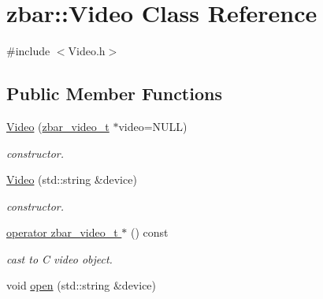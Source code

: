 \hypertarget{classzbar_1_1_video}{
\section{zbar::Video Class Reference}
\label{classzbar_1_1_video}
}


{\ttfamily \#include $<$Video.h$>$}

\subsection*{Public Member Functions}
\begin{DoxyCompactItemize}
\item 
\hypertarget{classzbar_1_1_video_a942db449a26345a34ca8510967ca3d24}{
\hyperlink{classzbar_1_1_video_a942db449a26345a34ca8510967ca3d24}{Video} (\hyperlink{zbar_8h_ac007ef048e15480ff7a6bf577cdf31fb}{zbar\_\-video\_\-t} $\ast$video=NULL)}
\label{classzbar_1_1_video_a942db449a26345a34ca8510967ca3d24}

\begin{DoxyCompactList}\small\item\em constructor. \end{DoxyCompactList}\item 
\hypertarget{classzbar_1_1_video_a742c410231b76a3e71cafa887789cd46}{
\hyperlink{classzbar_1_1_video_a742c410231b76a3e71cafa887789cd46}{Video} (std::string \&device)}
\label{classzbar_1_1_video_a742c410231b76a3e71cafa887789cd46}

\begin{DoxyCompactList}\small\item\em constructor. \end{DoxyCompactList}\item 
\hypertarget{classzbar_1_1_video_a8d0730e20300e1b0c4d4c11da04f615b}{
\hyperlink{classzbar_1_1_video_a8d0730e20300e1b0c4d4c11da04f615b}{operator zbar\_\-video\_\-t $\ast$} () const }
\label{classzbar_1_1_video_a8d0730e20300e1b0c4d4c11da04f615b}

\begin{DoxyCompactList}\small\item\em cast to C video object. \end{DoxyCompactList}\item 
\hypertarget{classzbar_1_1_video_a3f00f61e5e24629cae196bcfd80f1cf0}{
void \hyperlink{classzbar_1_1_video_a3f00f61e5e24629cae196bcfd80f1cf0}{open} (std::string \&device)}
\label{classzbar_1_1_video_a3f00f61e5e24629cae196bcfd80f1cf0}


\end{DoxyCompactItemize}

